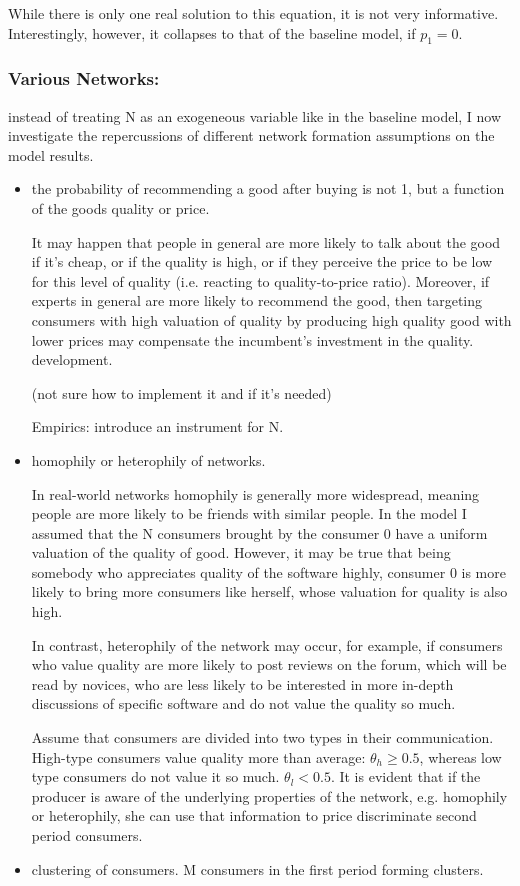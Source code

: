 \documentclass{article}
\numberwithin{figure}{section}
\numberwithin{table}{section}
\theoremstyle{indented}
\numberwithin{equation}{section} %
\begin{document}
While there is only one real solution to this equation, it is not very informative. Interestingly, however, it collapses to that of the baseline model, if $p_1 = 0$. 


\subsubsection{Various Networks:} instead of treating N as an exogeneous variable like in the baseline model, I now investigate the repercussions of different network formation assumptions on the model results.

\begin{itemize}
    \item the probability of recommending a good after buying is not 1, but a function of the goods quality or price.
    
    It may happen that people in general are more likely to talk about the good if it's cheap, or if the quality is high, or if they perceive the price to be low for this level of quality (i.e. reacting to quality-to-price ratio). Moreover, if experts in general are more likely to recommend the good, then targeting consumers with high valuation of quality by producing high quality good with lower prices may compensate the incumbent's investment in the quality. development.
    
    (not sure how to implement it and if it's needed)
    
    Empirics: introduce an instrument for N.
    
    \item homophily or heterophily of networks.
    
    In real-world networks homophily is generally more widespread, meaning people are more likely to be friends with similar people. In the model I assumed that the N consumers brought by the consumer 0 have a uniform valuation of the quality of good. However, it may be true that being somebody who appreciates quality of the software highly, consumer 0 is more likely to bring more consumers like herself, whose valuation for quality is also high.
    
    In contrast, heterophily of the network may occur, for example, if consumers who value quality are more likely to post reviews on the forum, which will be read by novices, who are less likely to be interested in more in-depth discussions of specific software and do not value the quality so much.
    
    Assume that consumers are divided into two types in their communication. High-type consumers value quality more than average: $\theta_h\geq 0.5$, whereas low type consumers do not value it so much. $\theta_l < 0.5$.  It is evident that if the producer is aware of the underlying properties of the network, e.g. homophily or heterophily, she can use that information to price discriminate second period consumers.  
	\item clustering of consumers.
M consumers in the first period forming clusters.
\end{itemize}



\newpage

\end{document}
